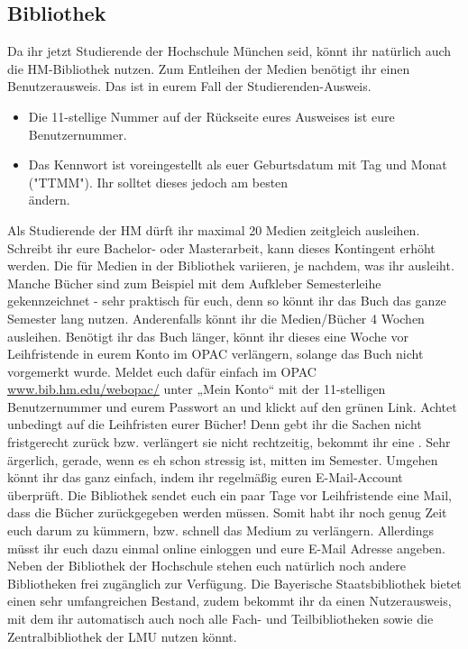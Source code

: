 \subsection{Bibliothek}
Da ihr jetzt Studierende der Hochschule München seid, könnt ihr 
natürlich auch die HM-Bibliothek nutzen.
Zum Entleihen der Medien benötigt ihr einen Benutzerausweis. Das ist 
in eurem Fall der Studierenden-Ausweis.
\begin{itemize}
\item Die 11-stellige Nummer auf der Rückseite eures Ausweises ist eure 
Benutzernummer. 
\item Das Kennwort ist voreingestellt als euer Geburtsdatum mit Tag und 
Monat ("TTMM"). Ihr solltet dieses jedoch am besten\\ ändern. 
\end{itemize}
Als Studierende der HM dürft ihr maximal 20 Medien zeitgleich 
ausleihen. Schreibt ihr eure Bachelor- oder Masterarbeit, kann dieses 
Kontingent erhöht werden. Die  für Medien in der Bibliothek
variieren, je nachdem, was ihr ausleiht. Manche Bücher sind zum 
Beispiel mit dem Aufkleber \glqq Semesterleihe\grqq{} gekennzeichnet - sehr 
praktisch für euch, denn so könnt ihr das Buch das ganze Semester 
lang nutzen. Anderenfalls könnt ihr die Medien/Bücher 4 Wochen 
ausleihen. Benötigt ihr das Buch länger, könnt ihr dieses eine Woche 
vor Leihfristende in eurem Konto im OPAC verlängern, solange das 
Buch nicht vorgemerkt wurde. Meldet euch dafür einfach im OPAC \url{www.bib.hm.edu/webopac/}
unter „Mein Konto“ mit der 11-stelligen Benutzernummer und eurem 
Passwort an und klickt auf den grünen Link.\doublebreak
Achtet unbedingt auf die Leihfristen eurer Bücher! Denn gebt ihr die 
Sachen nicht fristgerecht zurück bzw. verlängert sie nicht rechtzeitig, 
bekommt ihr eine . Sehr ärgerlich,
gerade, wenn es eh schon stressig ist, mitten im Semester. \doublebreak
Umgehen könnt ihr das ganz einfach, indem ihr regelmäßig euren 
E-Mail-Account überprüft. Die Bibliothek sendet euch ein paar Tage 
vor Leihfristende eine Mail, dass die Bücher zurückgegeben werden 
müssen. Somit habt ihr noch genug Zeit euch darum zu kümmern, 
bzw. schnell das Medium zu verlängern. Allerdings müsst ihr euch dazu 
einmal online einloggen und eure E-Mail Adresse angeben.\doublebreak
Neben der Bibliothek der Hochschule stehen euch natürlich noch 
andere Bibliotheken frei zugänglich zur Verfügung. Die Bayerische 
Staatsbibliothek bietet einen sehr umfangreichen Bestand, zudem 
bekommt ihr da einen Nutzerausweis, mit dem ihr automatisch auch 
noch alle Fach- und Teilbibliotheken sowie die 
Zentralbibliothek der LMU nutzen könnt.
